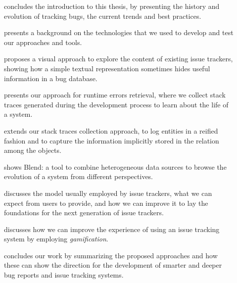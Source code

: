 \begin{description}
 \item[] concludes the introduction to this thesis, by presenting the history and evolution of tracking bugs, the current trends and best practices.

 \item[] presents a background on the technologies that we used to develop and test our approaches and tools.

\item[] proposes a visual approach to explore the content of existing issue trackers, showing how a simple textual representation sometimes hides useful information in a bug database.

\item[] presents our approach for runtime errors retrieval, where we collect stack traces generated during the development process to learn about the life of a system.

\item[] extends our stack traces collection approach, to log entities in a reified fashion and to capture the information implicitly stored in the relation among the objects.

\item[] shows Blend: a tool to combine heterogeneous data sources to browse the evolution of a system from different perspectives.

\item[] discusses the model usually employed by issue trackers, what we can expect from users to provide, and how we can improve it to lay the foundations for the next generation of issue trackers.

\item[] discusses how we can improve the experience of using an issue tracking system by employing \emph{gamification}.

\item[] concludes our work by summarizing the proposed approaches and how these can show the direction for the development of smarter and deeper bug reports and issue tracking systems.

\end{description}
